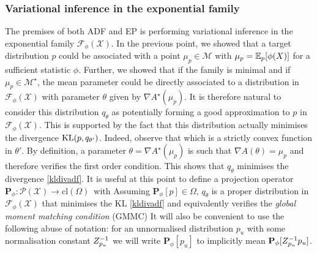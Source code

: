 \subsubsection{Variational inference in the exponential family}
%
The premises of both ADF and EP is performing variational inference in the exponential family $\mathcal F_{\phi}(\mathcal X)$. In the previous point, we showed that a target distribution $p$ could be associated with a point $\mu_p\in\mathcal M$ with $\mu_p=\mathbb E_{p}[\phi(X)]$ for a sufficient statistic $\phi$. Further, we showed that if the family is minimal and if $\mu_p\in\mathcal M^{\star}$, the mean parameter could be directly associated to a distribution in $\mathcal F_{\phi}(\mathcal X)$ with parameter $\theta$ given by $\nabla A^{\star}(\mu_p)$. It is therefore natural to consider this distribution $q_{\theta}$ as potentially forming a good approximation to $p$ in $\mathcal F_{\phi}(\mathcal X)$.
%
This is supported by the fact that this distribution actually minimises the divergence $\mathrm{KL}\!\left(p,q_{\theta'}\right)$. Indeed, observe that
%
%
which is a strictly convex function in $\theta'$. By definition, a parameter $\theta=\nabla A^{\star}(\mu_p)$ is such that $\nabla A(\theta)=\mu_p$ and therefore verifies the first order condition. This shows that $q_{\theta}$ minimises the divergence \eqref{kldivadf}. It is useful at this point to define a projection operator $\mathbf P_{\phi}:\mathcal P(\mathcal X) \to \mathrm{cl}(\Omega)$\, with
%
%
Assuming $\mathbf P_{\phi}[p] \in \Omega$, $q_{\theta}$ is a proper distribution in $\mathcal F_{\phi}(\mathcal X)$ that minimises the KL \eqref{kldivadf} and equivalently verifies the \emph{global moment matching condition} (GMMC) 
%
%
It will also be convenient to use the following abuse of notation: for an unnormalised distribution $p_{u}$ with some normalisation constant $Z_{p_{u}}^{-1}$ we will write $\mathbf P_{\phi}[p_{u}]$ to implicitly mean $\mathbf P_{\phi}[Z_{p_{u}}^{-1} p_{u}]$.

